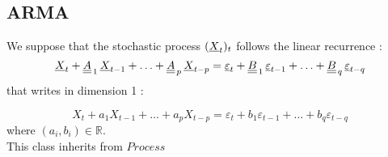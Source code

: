 \newpage \subsection{ARMA}


We suppose that the stochastic process $({\underline{X}}_t)_t$ follows the linear recurrence :
\begin{equation}\label{dimnUM}
 {\underline{X}}_t + {\underline{\underline{A}}}_{\, 1}   \,  {\underline{X}}_{t-1} + \hdots +  {\underline{\underline{A}}}_{\, p} \,   {\underline{X}}_{t-p} = 
   {\underline{\varepsilon}}_{t}+  {\underline{\underline{B}}}_ {\, 1} \,   {\underline{\varepsilon}}_{t-1}+   \hdots + {\underline{\underline{B}}}_{\, q}  \,  {\underline{\varepsilon}}_{t-q}
\end{equation}
that writes in dimension 1 :

\begin{equation}\label{dim1UM}
X_t +a_1  X_{t-1} + \hdots +  a_p X_{t-p} = 
  \varepsilon_{t}+  b_1 \varepsilon_{t-1}+   \hdots +b_q \varepsilon_{t-q}
\end{equation}
where $(a_i,b_i) \in \mathbb{R}$.\\

This class inherits from $Process$
